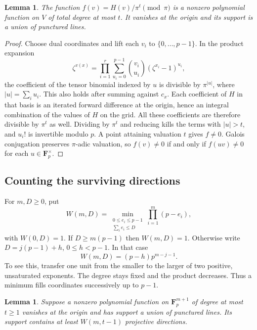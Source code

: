 \documentclass[11pt,letterpaper]{article}
\newcommand{\Fp}{\mathbf F_p}
\newtheorem{lemma}[theorem]{Lemma}
\theoremstyle{remark}
\begin{document}
\begin{lemma}\label{lem:reductiondegree}
The function $f(v)=H(v)/\pi^t\pmod\pi$ is a nonzero polynomial function on $V$ of total degree at most $t$. It vanishes at the origin and its support is a union of punctured lines.
\end{lemma}

\begin{proof}
Choose dual coordinates and lift each $v_i$ to $\{0,\ldots,p-1\}$. In the product expansion
\[
  \zeta^{v(x)}
  =\prod_{i=1}^r\sum_{u_i=0}^{p-1}\binom{v_i}{u_i}
     (\zeta^{x_i}-1)^{u_i},
\]
the coefficient of the tensor binomial indexed by $u$ is divisible by $\pi^{|u|}$, where $|u|=\sum_i u_i$. This also holds after summing against $c_x$. Each coefficient of $H$ in that basis is an iterated forward difference at the origin, hence an integral combination of the values of $H$ on the grid. All these coefficients are therefore divisible by $\pi^t$ as well. Dividing by $\pi^t$ and reducing kills the terms with $|u|>t$, and $u_i!$ is invertible modulo $p$. A point attaining valuation $t$ gives $f\ne0$. Galois conjugation preserves $\pi$-adic valuation, so $f(v)\ne0$ if and only if $f(uv)\ne0$ for each $u\in\Fp^\times$.
\end{proof}

\subsection{Counting the surviving directions}

For $m,D\ge0$, put
\[
  W(m,D)=\min_{\substack{0\le e_i\le p-1\\ \sum_i e_i\le D}}
               \prod_{i=1}^m (p-e_i),
\]
with $W(0,D)=1$. If $D\ge m(p-1)$ then $W(m,D)=1$. Otherwise write $D=j(p-1)+h$, $0\le h<p-1$. In that case
\[
    W(m,D)=(p-h)p^{m-j-1}.
\]
To see this, transfer one unit from the smaller to the larger of two positive, unsaturated exponents. The degree stays fixed and the product decreases. Thus a minimum fills coordinates successively up to $p-1$.

\begin{lemma}\label{lem:projectivecount}
Suppose a nonzero polynomial function on $\Fp^{m+1}$ of degree at most $t\ge1$ vanishes at the origin and has support a union of punctured lines. Its support contains at least $W(m,t-1)$ projective directions.
\end{lemma}
\end{document}
